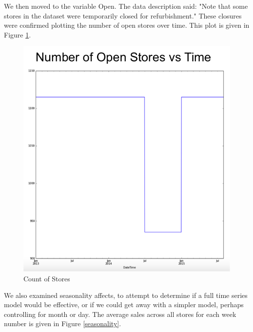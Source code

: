 \documentclass[DIV=calc, paper=a4, fontsize=11pt]{scrartcl}	 %
\begin{document}
We then moved to the variable Open. The data description said: "Note that some stores in the dataset were temporarily closed for refurbishment."\cite{RossmannKaggle} These closures were confirmed plotting the number of open stores over time. This plot is given in Figure \ref{closedstores}.
 

\begin{figure}[!htbp]
\centering
\caption{Count of Stores}
\label{closedstores}
\includegraphics[scale=0.70]{figures/closedstores.png}
\end{figure} 

We also examined seasonality affects, to attempt to determine if a full time series model would be effective, or if we could get away with a simpler model, perhaps controlling for month or day. The average sales across all stores for each week number is given in Figure \ref{seasonality}.
\end{document}
